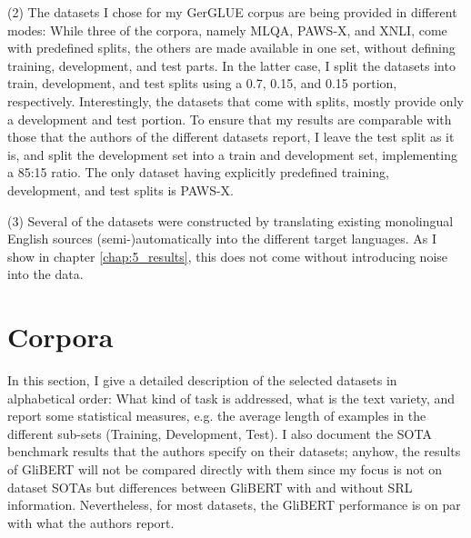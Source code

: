 (2) The datasets I chose for my GerGLUE corpus are being provided in different modes: While
three of the corpora, namely MLQA, PAWS-X, and XNLI, come with predefined splits, the others
are made available in one set, without defining training, development, and test parts. In
the latter case, I split the datasets into train, development, and test splits using a 0.7,
0.15, and 0.15 portion, respectively. Interestingly, the datasets that come with splits,
mostly provide only a development and test portion. To ensure that my results are comparable
with those that the authors of the different datasets report, I leave the test split as it
is, and split the development set into a train and development set, implementing a 85:15
ratio. The only dataset having explicitly predefined training, development, and test splits
is PAWS-X.

(3) Several of the datasets were constructed by translating existing monolingual English sources
(semi-)automatically into the different target languages. As I show in chapter \ref{chap:5_results},
this does not come without introducing noise into the data.





\section{Corpora}

In this section, I give a detailed description of the selected datasets in alphabetical order:
What kind of task is addressed, what is the text variety, and report some statistical measures,
e.g. the average length of examples in the different sub-sets (Training, Development, Test). I
also document the SOTA benchmark results that the authors specify on their datasets; anyhow,
the results of GliBERT will not be compared directly with them since my focus is not on dataset
SOTAs but differences between GliBERT with and without SRL information. Nevertheless, for most
datasets, the GliBERT performance is on par with what the authors report.



